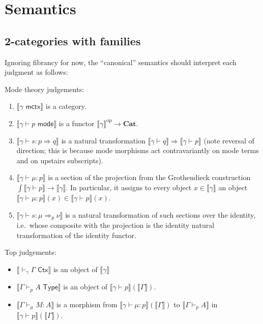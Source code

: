 \documentclass[10pt]{article}
\theoremstyle{definition}
\newcommand{\yields}{\vdash}
\newcommand{\tcell}{\Rightarrow}
\newcommand{\CTX}{\,\,\mathsf{Ctx}}
\newcommand{\ctx}{\,\,\mathsf{mctx}}
\newcommand{\TYPE}{\,\,\mathsf{Type}}
\newcommand{\type}{\,\,\mathsf{mode}}
\newcommand\TypeTwo[4]{\ensuremath{#1 \vdash #2 :  #3 \tcell #4}}
\newcommand\TermTwoT[5]{\ensuremath{#1 \vdash {#2} : #3 \tcell_{#5} #4}}
\newcommand\mm[1]{\llbracket #1 \rrbracket}
\newcommand\op{^{\mathrm{op}}}
\newcommand\Cat{\mathbf{Cat}}
\begin{document}
\section{Semantics}
\label{sec:semantics}

\subsection{2-categories with families}
\label{sec:2cwfs}

Ignoring fibrancy for now, the ``canonical'' semantics should interpret each judgment as follows:

Mode theory judgements:
\begin{enumerate}
\item $\mm{\gamma \ctx}$ is a category.
\item $\mm{\gamma \yields p \type}$ is a functor $\mm{\gamma}\op \to \Cat$.
\item $\mm{\TypeTwo{\gamma}{s}{p}{q}}$ is a natural transformation $\mm{\gamma \yields q} \Rightarrow \mm{\gamma \yields p}$ (note reversal of direction; this is because mode morphisms act contravariantly on mode terms and on upstairs subscripts).
\item $\mm{\gamma \yields \mu : p}$ is a section of the projection from the Grothendieck construction $\int\mm{\gamma\yields p} \to \mm{\gamma}$.
  In particular, it assigns to every object $x\in \mm{\gamma}$ an object $\mm{\gamma \yields \mu : p}(x)\in \mm{\gamma\yields p}(x)$.
\item $\mm{\TermTwoT{\gamma}{s}{\mu}{\nu}{p}}$ is a natural transformation of such sections over the identity, i.e.\ whose composite with the projection is the identity natural transformation of the identity functor.
\end{enumerate}

Top judgements: 
\begin{itemize}
\item $\mm{\yields_\gamma \Gamma \CTX}$ is an object of $\mm{\gamma}$
\item $\mm{\Gamma \yields_p A \TYPE}$ is an object of $\mm{\gamma \yields p}(\mm{\Gamma})$.
\item $\mm{\Gamma \yields_\mu M : A}$ is a morphism from $\mm{\gamma \yields \mu : p}(\mm{\Gamma})$ to $\mm{\Gamma \yields_p A}$ in $\mm{\gamma \yields p}(\mm{\Gamma})$.
\end{itemize}
\end{document}
